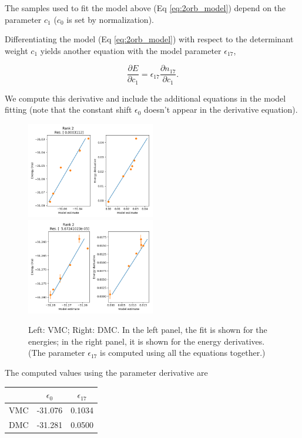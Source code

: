 The samples used to fit the model above (Eq \ref{eq:2orb_model}) depend on the parameter $c_{1}$ ($c_{0}$ is set by normalization).

Differentiating the model (Eq \ref{eq:2orb_model}) with respect to the determinant weight $c_1$  yields another equation with the model parameter $\epsilon_{17}$,

\begin{equation}
\frac{\partial E}{\partial c_1} = \epsilon_{17} \frac{\partial n_{17}}{\partial c_1}.
\label{eq:2orb_deriv}
\end{equation}

We compute this derivative and include the additional equations in the model fitting (note that the constant shift $\epsilon_0$ doesn't appear in the derivative equation).

\begin{figure}
\includegraphics[width=0.5\textwidth]{images/vmc_allderivs_2orb_model.png}
\includegraphics[width=0.5\textwidth]{images/dmc_allderivs_2orb_model.png}
\label{fig:2orb_deriv}
\caption{
Left: VMC; Right: DMC.
In the left panel, the fit is shown for the energies; in the right panel, it is shown for the energy derivatives.
(The parameter $\epsilon_17$ is computed using all the equations together.)}
\end{figure}

The computed values using the parameter derivative are 

\begin{tabular}{c|cc}
 & $\epsilon_{0}$ & $\epsilon_{17}$ \\\hline
VMC & -31.076 & 0.1034 \\
DMC & -31.281 & 0.0500 
\end{tabular}



